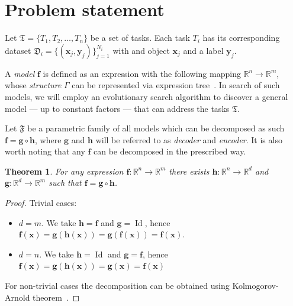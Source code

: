 \documentclass{article}
\newtheorem{theorem}{Theorem}[section]
\begin{document}
\section{Problem statement}
    Let \( \mathfrak{T} = \{T_1, T_2, \dots, T_n\} \) be a set of tasks. Each task \( T_i \) has its corresponding dataset \( \mathfrak{D}_i = \{(\mathbf{x}_j, \mathbf{y}_j) \}_{j=1}^{N_i} \) with and object \(\mathbf{x}_j\) and a label \(\mathbf{y}_j\).
    
    A \textit{model} \(\mathbf{f}\) is defined as an expression with the following mapping \(\mathbb{R}^n \rightarrow \mathbb{R}^m\), whose \textit{structure} \(\Gamma\) can be represented via expression tree~\citep{RudStr13}. In search of such models, we will employ an evolutionary search algorithm to discover a general model — up to constant factors — that can address the tasks \(\mathfrak{T}\). 
    
    Let \(\mathfrak{F}\) be a parametric family of all models which can be decomposed as such \(\mathbf{f} = \mathbf{g} \circ \mathbf{h}\), where \(\mathbf{g}\) and \(\mathbf{h}\) will be referred to as \textit{decoder} and \textit{encoder}. It is also worth noting that any \(\mathbf{f}\) can be decomposed in the prescribed way.
    \begin{theorem}\label{decomposition}
        For any expression \(\mathbf{f}: \mathbb{R}^n \rightarrow \mathbb{R}^m\) there exists \(\mathbf{h}:\mathbb{R}^n\rightarrow \mathbb{R}^d\) and \(\mathbf{g}:\mathbb{R}^d\rightarrow \mathbb{R}^m\) such that \(\mathbf{f} = \mathbf{g} \circ \mathbf{h}\).
    \end{theorem}
    \begin{proof}
        Trivial cases:
        \begin{itemize}
            \item \(d = m\). We take \(\mathbf{h} = \mathbf{f}\) and \(\mathbf{g} = \operatorname{Id}\), hence \(\mathbf{f}(\mathbf{x}) = \mathbf{g}(\mathbf{h}(\mathbf{x})) = \mathbf{g}(\mathbf{f}(\mathbf{x})) = \mathbf{f}(\mathbf{x})\).
            \item \(d = n\). We take \(\mathbf{h}=\operatorname{Id}\) and \(\mathbf{g}=\mathbf{f}\), hence \(\mathbf{f}(\mathbf{x}) = \mathbf{g}(\mathbf{h}(\mathbf{x})) = \mathbf{g}(\mathbf{x}) = \mathbf{f}(\mathbf{x})\)
        \end{itemize}
        For non-trivial cases the decomposition can be obtained using Kolmogorov-Arnold theorem~\cite{kolmogorov1961representation}. 
    \end{proof}
\end{document}
